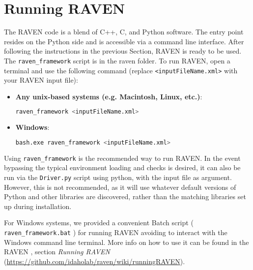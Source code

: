 \section{Running RAVEN}
\label{HowToRun}

The RAVEN code is a blend of C++, C, and Python software. The entry point
resides on the Python side and is accessible via a command line interface.
%
After following the instructions in the previous Section, RAVEN is ready to be
used.
%
The \texttt{raven\_framework} script is in the raven folder.
%
To run RAVEN, open a terminal and use the following command (replace \texttt{<inputFileName.xml>} with your RAVEN input file):

\begin{itemize}

  \item \textbf{Any unix-based systems (e.g. Macintosh, Linux, etc.)}:
\begin{lstlisting}[language=bash]
raven_framework <inputFileName.xml>
\end{lstlisting}
  \item \textbf{Windows}:
  \begin{lstlisting}[language=bash]
bash.exe raven_framework <inputFileName.xml>
\end{lstlisting}
  
\end{itemize}

Using \texttt{raven\_framework} is the recommended way to run RAVEN.  In the event bypassing the typical
environment loading and checks is desired, it can also be run via
the \texttt{Driver.py} script using python, with the input file as argument.  However, this is not
recommended, as it will use whatever default versions of Python and other libraries are discovered, rather
than the matching libraries set up during installation.

\nb For Windows systems, we provided a convenient Batch script ( \texttt{raven\_framework.bat} ) for running RAVEN 
avoiding to interact with the Windows command line terminal. More info on how to use it can be found in the RAVEN
\wiki , section \textit{Running RAVEN} (\url{https://github.com/idaholab/raven/wiki/runningRAVEN}).


